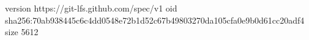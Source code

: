 version https://git-lfs.github.com/spec/v1
oid sha256:70ab938445c6c4dd0548e72b1d52c67b49803270da105cfa0e9b0d61cc20adf4
size 5612
